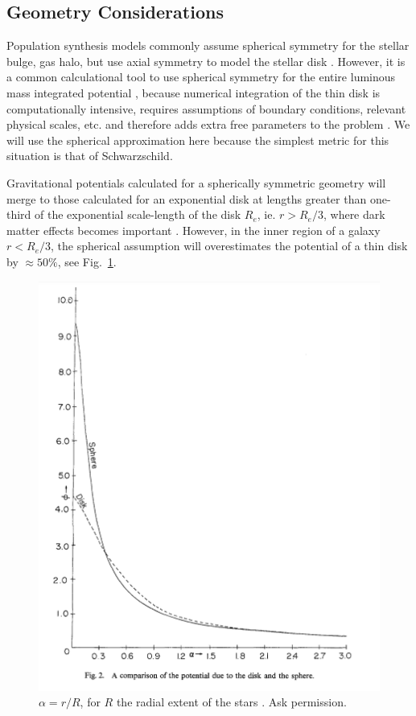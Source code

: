\documentclass[reprint,%
 amsmath,amssymb,
 aps,
]{revtex4-1}
\begin{document}
  
\subsection{  Geometry Considerations  }\label{GeomSphere}
  
   Population synthesis models commonly assume spherical symmetry for the 
  stellar bulge, gas halo, but use axial symmetry to model     the stellar disk \cite{1954AJ.....59..273S}.
 However, it is a common calculational  tool to use spherical symmetry for the entire luminous mass integrated potential \cite{2022A&A...664A..40M,PhysRevD.70.083509}, because numerical integration of the thin disk is  computationally intensive,  requires assumptions of  boundary conditions,   relevant physical scales,  etc. and therefore adds extra free parameters to the problem \cite{2011A&A...531A..36H}.  
 We will use the spherical approximation here  because  the simplest metric for this situation is that of 
 Schwarzschild. 
 
Gravitational potentials calculated for  a spherically symmetric  geometry will 
  merge to those calculated for an exponential disk  at lengths greater than one-third of the exponential scale-length of the disk $R_e$, ie.  $r> R_e/3$\cite{Chatterjee}, where dark matter effects becomes important \cite{1985ApJAlbada}. 
However, 
    in the inner region of a galaxy $r< R_e/3$,  the spherical assumption will 
    overestimates the potential of a thin disk by $\approx   50\%$, see Fig.~\ref{fig:my_geom}. 
    

  \begin{figure}
    \centering
     \includegraphics[width=\linewidth]{Chatterjee_SphereDisk.png}
    \caption{ $\alpha = r/R$, for $R$ the radial extent of the stars \cite{Chatterjee}. Ask permission.}
    \label{fig:my_geom}
\end{figure}  
    
\end{document}
